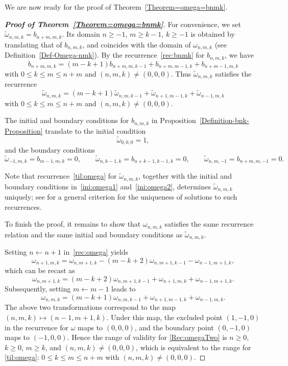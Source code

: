 \documentclass[reqno, 12pt]{article}
\theoremstyle{mydefinition}
\theoremstyle{myremark}
\numberwithin{algorithm}{section}
\begin{document}
We are now ready for the proof of Theorem~\ref{Theorem=omega=bnmk}.
\begin{proof}[{\bf Proof of Theorem~\ref{Theorem=omega=bnmk}}]
For convenience, we set $\tilde{\omega}_{n,m,k}=b_{n+m,m,k}$. Its domain $n\ge -1$, $m\ge k-1$, $k\ge -1$ is obtained by translating that of $b_{n,m,k}$, and coincides with the domain of $\omega_{n,m,k}$ (see Definition~\ref{Def-Omega-nmk}). By the recurrence~\eqref{rec:bnmk} for $b_{n,m,k}$, we have
$$
b_{n+m,m,k}=(m-k+1)b_{n+m,m,k-1} +b_{n+m,m-1,k}+ b_{n+m-1,m,k}
$$
with $0\le k\le m\le n+m$ and $(n,m,k)\neq (0,0,0)$.
Thus $\tilde{\omega}_{n,m,k}$ satisfies the recurrence
\begin{equation}\label{til:omega}
\tilde{\omega}_{n,m,k}= (m-k+1)\tilde{\omega}_{n,m,k-1}+\tilde{\omega}_{n+1,m-1,k}+\tilde{\omega}_{n-1,m,k}
\end{equation}
with $0\le k\le m\le n+m$ and $(n,m,k)\neq (0,0,0)$.

The initial and boundary conditions for $b_{n,m,k}$ in Proposition~\ref{Definition-bnk-Proposition} translate to the initial condition
\begin{equation}\label{ini:omega1}
\tilde{\omega}_{0,0,0}=1,
\end{equation}
and the boundary conditions
\begin{equation}\label{ini:omega2}
\tilde{\omega}_{-1,m,k}=b_{m-1,m,k}=0,\qquad
\tilde{\omega}_{n,k-1,k}=b_{n+k-1,k-1,k}=0,\qquad
\tilde{\omega}_{n,m,-1}=b_{n+m,m,-1}=0.
\end{equation}

Note that recurrence~\eqref{til:omega} for $\tilde{\omega}_{n,m,k}$, together with the initial and boundary conditions in~\eqref{ini:omega1} and~\eqref{ini:omega2}, determines $\tilde{\omega}_{n,m,k}$ uniquely; see \cite{Bousquet2000} for a general criterion for the uniqueness of solutions to such recurrences.

To finish the proof, it remains to show that $\omega_{n,m,k}$ satisfies the same recurrence relation and the same initial and boundary conditions as $\tilde{\omega}_{n,m,k}$.

Setting $n\leftarrow n+1$ in~\eqref{rec:omega} yields
$$
\omega_{n+1,m,k}=\omega_{n,m+1,k}-(m-k+2)\omega_{n,m+1,k-1}-\omega_{n-1,m+1,k},
$$
which can be recast as
$$
\omega_{n,m+1,k}=(m-k+2)\omega_{n,m+1,k-1}+\omega_{n+1,m,k}+\omega_{n-1,m+1,k}.
$$
Subsequently, setting $m\leftarrow m-1$ leads to
\begin{equation}\label{Rec:omegaTwo}
\omega_{n,m,k}=(m-k+1)\omega_{n,m,k-1}+\omega_{n+1,m-1,k}+\omega_{n-1,m,k}.
\end{equation}
The above two transformations correspond to the map $(n,m,k)\mapsto (n-1,m+1,k)$. Under this map, the excluded point $(1,-1,0)$ in the recurrence for $\omega$ maps to $(0,0,0)$, and the boundary point $(0,-1,0)$ maps to $(-1,0,0)$. Hence the range of validity for \eqref{Rec:omegaTwo} is $n\ge 0$, $k\ge 0$, $m\ge k$, and $(n,m,k)\neq (0,0,0)$, which is equivalent to the range for \eqref{til:omega}: $0\le k\le m\le n+m$ with $(n,m,k)\neq (0,0,0)$.


\end{proof}
\end{document}
